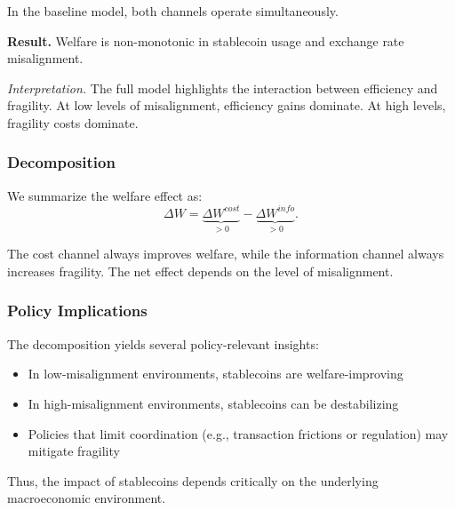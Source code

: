 In the baseline model, both channels operate simultaneously.

\textbf{Result.} Welfare is non-monotonic in stablecoin usage and exchange rate misalignment.

\textit{Interpretation.} The full model highlights the interaction between efficiency and fragility. At low levels of misalignment, efficiency gains dominate. At high levels, fragility costs dominate.

\subsubsection{Decomposition}

We summarize the welfare effect as:
\begin{equation}
\Delta W = \underbrace{\Delta W^{cost}}_{>0} - \underbrace{\Delta W^{info}}_{>0}.
\end{equation}

The cost channel always improves welfare, while the information channel always increases fragility. The net effect depends on the level of misalignment.

\subsubsection{Policy Implications}

The decomposition yields several policy-relevant insights:

\begin{itemize}
\item In low-misalignment environments, stablecoins are welfare-improving
\item In high-misalignment environments, stablecoins can be destabilizing
\item Policies that limit coordination (e.g., transaction frictions or regulation) may mitigate fragility
\end{itemize}

Thus, the impact of stablecoins depends critically on the underlying macroeconomic environment.
